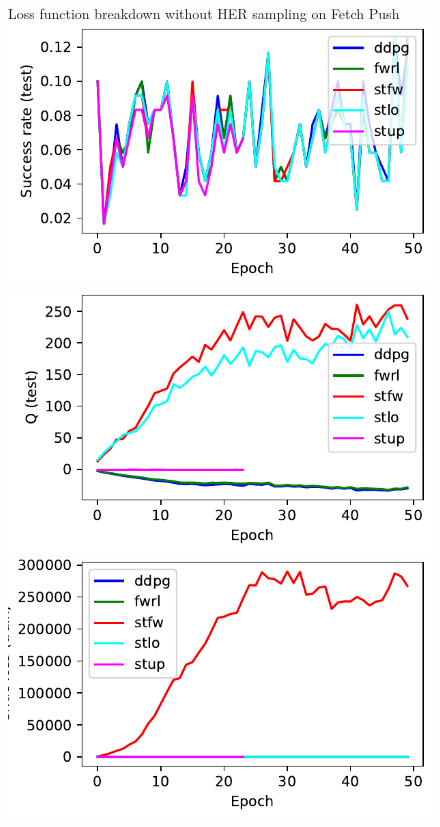 %
\begin{figure}
  \def\frac{0.32}
Loss function breakdown without HER sampling on Fetch Push\\
  \includegraphics[width=\frac\columnwidth]{media/res/f84daa7-FetchPush-v1-stfw-none/test/success_rate.pdf}%
  \includegraphics[width=\frac\columnwidth]{media/res/f84daa7-FetchPush-v1-stfw-none/test/mean_Q.pdf}%
  \includegraphics[width=\frac\columnwidth]{media/res/f84daa7-FetchPush-v1-stfw-none/train/critic_loss.pdf}\\

\end{figure}
